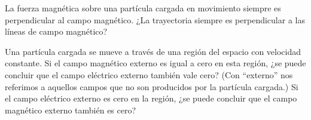 %
\begin{Exercise}
    La fuerza magnética sobre una partícula cargada en movimiento siempre es perpendicular al campo magnético. ¿La trayectoria siempre es perpendicular a las líneas de campo magnético?
\end{Exercise}
%
\begin{Exercise}
    Una partícula cargada se mueve a través de una región del espacio con velocidad constante. Si el campo magnético externo es igual a cero en esta región, ¿se puede concluir que el campo eléctrico externo también vale cero? (Con ``externo'' nos referimos a aquellos campos que no son producidos por la partícula cargada.) Si el campo eléctrico externo es cero en la región, ¿se puede concluir que el campo magnético externo también es cero?
\end{Exercise}
%
\begin{Exercise}

\end{Exercise}
